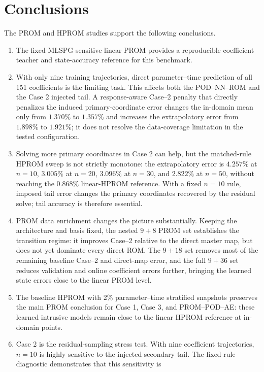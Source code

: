 \documentclass[11pt]{article}
\begin{document}
\section{Conclusions}
The PROM and HPROM studies support the following conclusions.
\begin{enumerate}
  \item The fixed MLSPG-sensitive linear PROM provides a reproducible coefficient teacher and state-accuracy
  reference for this benchmark.
  \item With only nine training trajectories, direct parameter--time prediction of all 151 coefficients is the
  limiting task.  This affects both the POD--NN--ROM and the Case 2 injected tail.  A response-aware Case--2
  penalty that directly penalizes the induced primary-coordinate error changes the in-domain mean only from
  $1.370\%$ to $1.357\%$ and increases the extrapolatory error from $1.898\%$ to $1.921\%$; it does not resolve
  the data-coverage limitation in the tested configuration.
  \item Solving more primary coordinates in Case 2 can help, but the matched-rule HPROM sweep is not strictly
  monotone: the extrapolatory error is $4.257\%$ at $n=10$, $3.005\%$ at $n=20$, $3.096\%$ at $n=30$, and $2.822\%$
  at $n=50$, without reaching the $0.868\%$ linear-HPROM reference.  With a fixed $n=10$ rule, imposed tail error
  changes the primary coordinates recovered by the residual solve; tail accuracy is therefore essential.
  \item PROM data enrichment changes the picture substantially.  Keeping the architecture and basis fixed, the
  nested $9+8$ PROM set establishes the transition regime: it improves Case--2 relative to the direct master map,
  but does not yet dominate every direct ROM.  The $9+18$ set removes most of the remaining baseline Case--2 and
  direct-map error, and the full $9+36$ set reduces validation and online coefficient errors further, bringing the
  learned state errors close to the linear PROM level.
  \item The baseline HPROM with 2\% parameter--time stratified snapshots preserves the main PROM conclusion for
  Case 1, Case 3, and PROM--POD--AE: these learned intrusive models remain close to the linear HPROM reference at
  in-domain points.
  \item Case 2 is the residual-sampling stress test.  With nine coefficient trajectories, \(n=10\) is highly
  sensitive to the injected secondary tail.  The fixed-rule diagnostic demonstrates that this sensitivity is

\end{enumerate}
\end{document}
